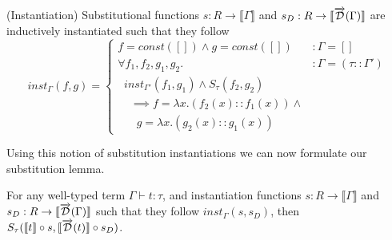 \documentclass[11pt, final]{article}
\begin{document}
  \begin{definition}(Instantiation)
    Substitutional functions $s : R \rightarrow \llbracket \Gamma \rrbracket$ and $s_D : R \rightarrow \llbracket \overrightarrow{\mathcal{D}}(\Gamma) \rrbracket$ are inductively instantiated such that they follow
    \begin{equation}
      inst_\Gamma(f, g) =
        \left\{
          \begin{array}{ll}
            f = const([]) \wedge g = const([])
              & : \Gamma = [] \\
            \forall f_1, f_2, g_1, g_2.
              & : \Gamma = (\tau :: \Gamma') \\
              \;\;inst_{\Gamma'}(f_1, g_1) \wedge S_\tau(f_2, g_2) \\
              \;\;\;\; \implies f = \lambda x. (f_2(x) :: f_1(x)) \wedge \\
              \;\;\;\;\;\; g = \lambda x. (g_2(x) :: g_1(x))
          \end{array}
        \right.
    \label{eqn:lr_base}
    \end{equation}
  \end{definition}

  Using this notion of substitution instantiations we can now formulate our substitution lemma.

  \begin{lemma}[Substitution]\label{thm:substitution_lemma}
    For any well-typed term $\Gamma \vdash t : \tau$, and instantiation functions $s : R \rightarrow \llbracket \Gamma \rrbracket$ and $s_D : R \rightarrow \llbracket \overrightarrow{\mathcal{D}}(\Gamma) \rrbracket$ such that they follow $inst_\Gamma(s, s_D)$, then $S_\tau(\llbracket t\rrbracket \circ s, \llbracket \overrightarrow{\mathcal{D}}(t)\rrbracket \circ s_D)$.
  \end{lemma}
\end{document}
